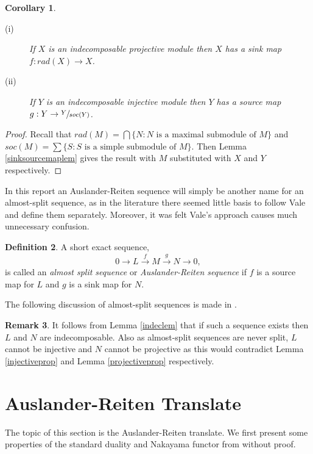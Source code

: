 \documentclass[11.5pt, twoside, a4paper, titlepage]{report}
\theoremstyle{definition}
\newtheorem{mydef}{Definition}[section]
\newtheorem{rem}[mydef]{Remark}
\theoremstyle{plain}
\newtheorem{cor}[mydef]{Corollary}
\begin{document}
\begin{cor} \label{radsoccor}
\begin{description}
\item [(i)] If $X$ is an indecomposable projective module then $X$ has a sink map $f: rad(X) \to X$.
\item [(ii)] If $Y$ is an indecomposable injective module then $Y$ has a source map $g: Y \to \sfrac{Y}{soc(Y)}$.
\end{description}
\end{cor}
\begin{proof}
Recall that $rad(M)=\bigcap \{N: N\text{ is a maximal submodule of }M\}$ and $soc(M)=\sum \{S: S\text{ is a simple submodule of }M\}$. Then Lemma \ref{sinksourcemaplem} gives the result with $M$ substituted with $X$ and $Y$ respectively.
\end{proof}

In this report an Auslander-Reiten sequence will simply be another name for an almost-split sequence, as in the literature there seemed little basis to follow Vale and define them separately. Moreover, it was felt Vale's approach causes much unnecessary confusion.

\begin{mydef}
A short exact sequence,
\begin{equation*}
0 \xrightarrow{} L \xrightarrow{f} M \xrightarrow{g} N \xrightarrow{} 0,
\end{equation*}
is called an \emph{almost split sequence} or \emph{Auslander-Reiten sequence} if $f$ is a source map for $L$ and $g$ is a sink map for $N$.
\end{mydef}

The following discussion of almost-split sequences is made in \cite{Assem}.
\begin{rem}
It follows from Lemma \ref{indeclem} that if such a sequence exists then $L$ and $N$ are indecomposable. Also as almost-split sequences are never split, $L$ cannot be injective and $N$ cannot be projective as this would contradict Lemma \ref{injectiveprop} and Lemma \ref{projectiveprop} respectively.
\end{rem}

\section{Auslander-Reiten Translate}
The topic of this section is the Auslander-Reiten translate. We first present some properties of the standard duality and Nakayama functor from \cite{CB2} without proof.
\end{document}
